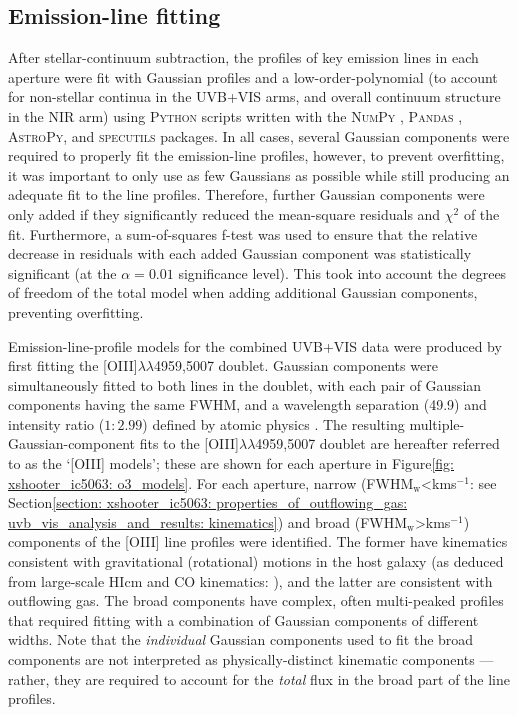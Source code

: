\newpage
\subsection{Emission-line fitting}
\label{section: xshooter_ic_5063: observations_and_data_reduction: emission_line_fitting}

After stellar-continuum subtraction, the profiles of key emission lines in each aperture were fit with Gaussian profiles and a low-order-polynomial (to account for non-stellar continua in the UVB+VIS arms, and overall continuum structure in the NIR arm) using \textsc{Python} scripts written with the \textsc{NumPy} \citep{Harris2020}, \textsc{Pandas} \citep{reback2020pandas}, \textsc{AstroPy}, and \textsc{specutils} packages. In all cases, several Gaussian components were required to properly fit the emission-line profiles, however, to prevent overfitting, it was important to only use as few Gaussians as possible while still producing an adequate fit to the line profiles. Therefore, further Gaussian components were only added if they significantly reduced the mean-square residuals and $\chi^2$ of the fit. Furthermore, a sum-of-squares f-test \citep{Montgomery2012} was used to ensure that the relative decrease in residuals with each added Gaussian component was statistically significant (at the $\alpha=0.01$ significance level). This took into account the degrees of freedom of the total model when adding additional Gaussian components, preventing overfitting.

Emission-line-profile models for the combined UVB+VIS data were produced by first fitting the [OIII]$\lambda\lambda$4959,5007 doublet. Gaussian components were simultaneously fitted to both lines in the doublet, with each pair of Gaussian components having the same FWHM, and a wavelength separation (49.9\;{\AA}) and intensity ratio ($1:2.99$) defined by atomic physics \citep{Osterbrock2006}. The resulting multiple-Gaussian-component fits to the [OIII]$\lambda\lambda$4959,5007 doublet are hereafter referred to as the `[OIII] models'; these are shown for each aperture in Figure\;\ref{fig: xshooter_ic5063: o3_models}. For each aperture, narrow (FWHM$_\mathrm{w}$\;\textless{}\;km\;s$^{-1}$: see Section\;\ref{section: xshooter_ic5063: properties_of_outflowing_gas: uvb_vis_analysis_and_results: kinematics}) and broad (FWHM$_\mathrm{w}$\;\textgreater{}\;km\;s$^{-1}$) components of the [OIII] line profiles were identified. The former have kinematics consistent with gravitational (rotational) motions in the host galaxy (as deduced from large-scale HI\;cm and CO kinematics: \citealt{Morganti1998, Morganti2015}), and the latter are consistent with outflowing gas. The broad components have complex, often multi-peaked profiles that required fitting with a combination of Gaussian components of different widths. Note that the \textit{individual} Gaussian components used to fit the broad components are not interpreted as physically-distinct kinematic components --- rather, they are required to account for the \textit{total} flux in the broad part of the line profiles.

